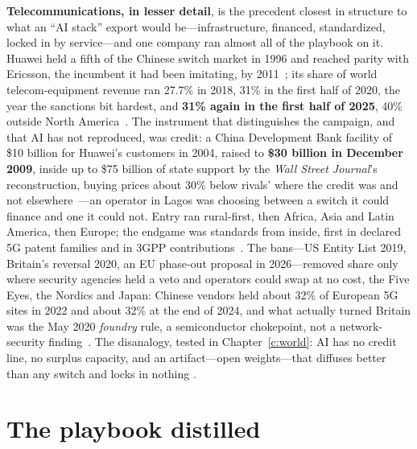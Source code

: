 \textbf{Telecommunications, in lesser detail}, is the precedent closest in structure to what an ``AI stack'' export would be---infrastructure, financed, standardized, locked in by service---and one company ran almost all of the playbook on it. Huawei held a fifth of the Chinese switch market in 1996 and reached parity with Ericsson, the incumbent it had been imitating, by 2011~\cite{ahrens-huawei}; its share of world telecom-equipment revenue ran 27.7\% in 2018, 31\% in the first half of 2020, the year the sanctions bit hardest, and \textbf{31\% again in the first half of 2025}, 40\% outside North America~\cite{delloro-huawei}. The instrument that distinguishes the campaign, and that AI has not reproduced, was credit: a China Development Bank facility of \$10 billion for Huawei's customers in 2004, raised to \textbf{\$30 billion in December 2009}, inside up to \$75 billion of state support by the \emph{Wall Street Journal}'s reconstruction, buying prices about 30\% below rivals' where the credit was and not elsewhere~\cite{wsj-huawei-state}---an operator in Lagos was choosing between a switch it could finance and one it could not. Entry ran rural-first, then Africa, Asia and Latin America, then Europe; the endgame was standards from inside, first in declared 5G patent families and in 3GPP contributions~\cite{huawei-5g-seps}. The bans---US Entity List 2019, Britain's reversal 2020, an EU phase-out proposal in 2026---removed share only where security agencies held a veto and operators could swap at no cost, the Five Eyes, the Nordics and Japan: Chinese vendors held about 32\% of European 5G sites in 2022 and about 32\% at the end of 2024, and what actually turned Britain was the May 2020 \emph{foundry} rule, a semiconductor chokepoint, not a network-security finding~\cite{huawei-bans}. The disanalogy, tested in Chapter~\ref{c:world}: AI has no credit line, no surplus capacity, and an artifact---open weights---that diffuses better than any switch and locks in nothing .

\section{The playbook distilled}

